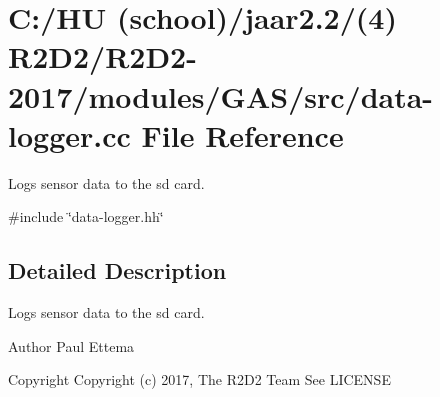 \hypertarget{data-logger_8cc}{}\section{C\+:/\+HU (school)/jaar2.2/(4) R2\+D2/\+R2\+D2-\/2017/modules/\+G\+A\+S/src/data-\/logger.cc File Reference}
\label{data-logger_8cc}


Logs sensor data to the sd card.  


{\ttfamily \#include \char`\"{}data-\/logger.\+hh\char`\"{}}\newline


\subsection{Detailed Description}
Logs sensor data to the sd card. 

\begin{DoxyAuthor}{Author}
Paul Ettema 
\end{DoxyAuthor}
\begin{DoxyCopyright}{Copyright}
Copyright (c) 2017, The R2\+D2 Team  See L\+I\+C\+E\+N\+SE 
\end{DoxyCopyright}
